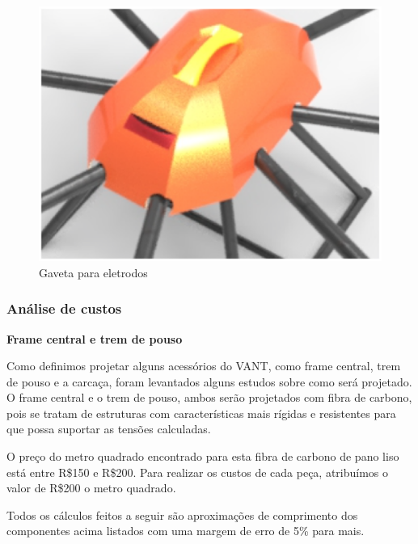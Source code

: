 \begin{figure}[H]
    \centering
      \includegraphics[keepaspectratio=true,scale=0.5]{figuras/keyshot2.eps}
    \caption{ Gaveta para eletrodos}
    \label{fig:keyshot2}
\end{figure}

\subsubsection{Análise de custos}

\indent \textbf{Frame central e trem de pouso}

Como definimos projetar alguns acessórios do VANT, como frame central, trem de pouso e a carcaça, foram levantados alguns estudos sobre como será projetado. O frame central e o trem de pouso, ambos serão projetados com fibra de carbono, pois se tratam de estruturas com características mais rígidas e resistentes para que possa suportar as tensões calculadas.

O preço do metro quadrado encontrado para esta fibra de carbono de pano liso está entre R\$150 e R\$200. Para realizar os custos de cada peça, atribuímos o valor de R\$200 o metro quadrado.

Todos os cálculos feitos a seguir são aproximações de comprimento dos componentes acima listados com uma margem de erro de 5\% para mais.

